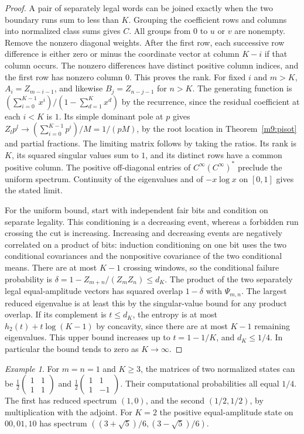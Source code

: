 \documentclass[11pt,reqno]{amsart}
\theoremstyle{definition}
\theoremstyle{remark}
\newtheorem{example}[theorem]{Example}
\numberwithin{equation}{section}
\begin{document}
\begin{proof}
A pair of separately legal words can be joined exactly when
the two boundary runs sum to less than \(K\). Grouping the
coefficient rows and columns into normalized class sums gives
\(C\). All groups from \(0\) to \(u\) or \(v\) are nonempty.
Remove the nonzero diagonal weights. After the first row,
each successive row difference is either zero or minus the
coordinate vector at column \(K-i\) if that column occurs.
The nonzero differences have distinct positive column indices,
and the first row has nonzero column \(0\). This proves the rank.
For fixed \(i\) and \(m>K\), \(A_i=Z_{m-i-1}\), and likewise
\(B_j=Z_{n-j-1}\) for \(n>K\). The generating function is
\((\sum_{i=0}^{K-1} x^i)/(1-\sum_{d=1}^K x^d)\) by the
recurrence, since the residual coefficient at each \(i<K\)
is \(1\). Its simple dominant pole at \(p\) gives
\(Z_l p^l\to (\sum_{i=0}^{K-1}p^i)/M=1/(pM)\), by the
root location in Theorem~\ref{m9:pisot} and partial fractions.
The limiting matrix follows by taking the ratios. Its rank
is \(K\), its squared singular values sum to \(1\), and its
distinct rows have a common positive column. The positive
off-diagonal entries of \(C^\infty(C^\infty)^*\) preclude the
uniform spectrum. Continuity of the eigenvalues and of
\(-x\log x\) on \([0,1]\) gives the stated limit.

For the uniform bound, start with independent fair bits
and condition on separate legality. This conditioning is a
decreasing event, whereas a forbidden run crossing the cut
is increasing. Increasing and decreasing events are negatively
correlated on a product of bits: induction conditioning on
one bit uses the two conditional covariances and the
nonpositive covariance of the two conditional means.
There are at most \(K-1\) crossing windows, so the conditional
failure probability is \(\delta=1-Z_{m+n}/(Z_m Z_n)\le d_K\).
The product of the two separately legal equal-amplitude
vectors has squared overlap \(1-\delta\) with \(\Psi_{m,n}\).
The largest reduced eigenvalue is at least this by the
singular-value bound for any product overlap. If its complement
is \(t\le d_K\), the entropy is at most \(h_2(t)+t\log(K-1)\)
by concavity, since there are at most \(K-1\) remaining
eigenvalues. This upper bound increases up to \(t=1-1/K\),
and \(d_K\le1/4\). In particular the bound tends to zero
as \(K\to\infty\).
\end{proof}

\begin{example}\label{m9:phase}
For \(m=n=1\) and \(K\ge3\), the matrices of two normalized
states can be \(\frac12\left(\begin{smallmatrix}1&1\\1&1\end{smallmatrix}\right)\)
and \(\frac12\left(\begin{smallmatrix}1&1\\1&-1\end{smallmatrix}\right)\).
Their computational probabilities all equal \(1/4\).
The first has reduced spectrum \((1,0)\), and the second
\((1/2,1/2)\), by multiplication with the adjoint.
For \(K=2\) the positive equal-amplitude state on \(00,01,10\)
has spectrum \(((3+\sqrt5)/6,(3-\sqrt5)/6)\).
\end{example}
\end{document}
